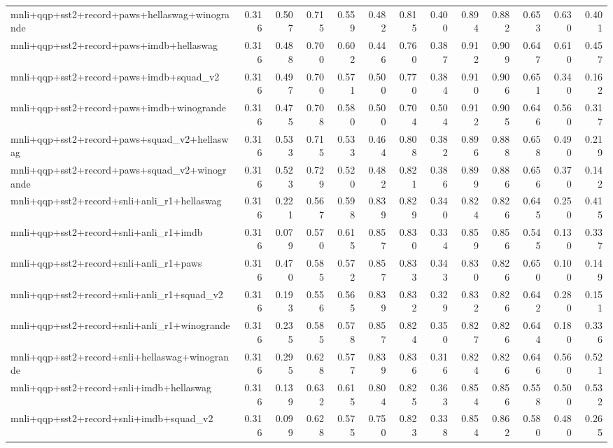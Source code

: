 \begin{table}[t]
\begin{tabular}{lrrrrrrrrrrrr}
    mnli+qqp+sst2+record+paws+hellaswag+winogrande & 0.316 & 0.507 & 0.715 & 0.559 & 0.482 & 0.815 & 0.400 & 0.894 & 0.882 & 0.653 & 0.630 & 0.401 \\
    mnli+qqp+sst2+record+paws+imdb+hellaswag & 0.316 & 0.488 & 0.700 & 0.602 & 0.446 & 0.760 & 0.387 & 0.912 & 0.909 & 0.647 & 0.610 & 0.457 \\
    mnli+qqp+sst2+record+paws+imdb+squad\_v2 & 0.316 & 0.497 & 0.700 & 0.571 & 0.500 & 0.770 & 0.384 & 0.910 & 0.906 & 0.651 & 0.340 & 0.162 \\
    mnli+qqp+sst2+record+paws+imdb+winogrande & 0.316 & 0.475 & 0.708 & 0.580 & 0.500 & 0.704 & 0.504 & 0.912 & 0.905 & 0.646 & 0.560 & 0.317 \\
    mnli+qqp+sst2+record+paws+squad\_v2+hellaswag & 0.316 & 0.533 & 0.715 & 0.533 & 0.464 & 0.808 & 0.382 & 0.896 & 0.888 & 0.658 & 0.490 & 0.219 \\
    mnli+qqp+sst2+record+paws+squad\_v2+winogrande & 0.316 & 0.523 & 0.729 & 0.520 & 0.482 & 0.821 & 0.386 & 0.899 & 0.886 & 0.656 & 0.370 & 0.142 \\
    mnli+qqp+sst2+record+snli+anli\_r1+hellaswag & 0.316 & 0.221 & 0.567 & 0.598 & 0.839 & 0.829 & 0.340 & 0.824 & 0.826 & 0.645 & 0.250 & 0.415 \\
    mnli+qqp+sst2+record+snli+anli\_r1+imdb & 0.316 & 0.079 & 0.570 & 0.615 & 0.857 & 0.830 & 0.334 & 0.859 & 0.856 & 0.545 & 0.130 & 0.337 \\
    mnli+qqp+sst2+record+snli+anli\_r1+paws & 0.316 & 0.470 & 0.585 & 0.572 & 0.857 & 0.833 & 0.343 & 0.830 & 0.826 & 0.650 & 0.100 & 0.149 \\
    mnli+qqp+sst2+record+snli+anli\_r1+squad\_v2 & 0.316 & 0.193 & 0.556 & 0.565 & 0.839 & 0.832 & 0.329 & 0.832 & 0.826 & 0.642 & 0.280 & 0.151 \\
    mnli+qqp+sst2+record+snli+anli\_r1+winogrande & 0.316 & 0.235 & 0.585 & 0.578 & 0.857 & 0.824 & 0.350 & 0.827 & 0.826 & 0.644 & 0.180 & 0.336 \\
    mnli+qqp+sst2+record+snli+hellaswag+winogrande & 0.316 & 0.295 & 0.628 & 0.577 & 0.839 & 0.836 & 0.316 & 0.824 & 0.826 & 0.646 & 0.560 & 0.521 \\
    mnli+qqp+sst2+record+snli+imdb+hellaswag & 0.316 & 0.139 & 0.632 & 0.615 & 0.804 & 0.825 & 0.363 & 0.854 & 0.856 & 0.558 & 0.500 & 0.532 \\
    mnli+qqp+sst2+record+snli+imdb+squad\_v2 & 0.316 & 0.099 & 0.628 & 0.575 & 0.750 & 0.823 & 0.338 & 0.854 & 0.862 & 0.580 & 0.480 & 0.265 \\

\end{tabular}
\end{table}
